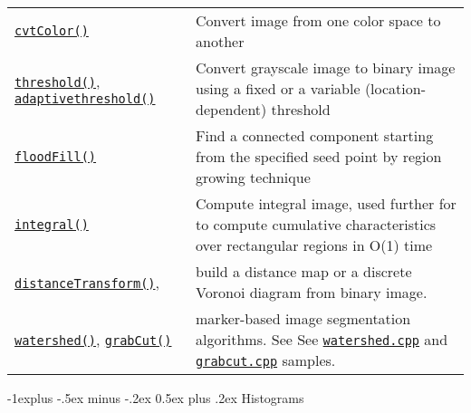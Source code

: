 \documentclass[10pt,landscape]{article}
\makeatletter
\renewcommand{\subsection}{\@startsection{subsection}{2}{0mm}%
                                {-1explus -.5ex minus -.2ex}%
                                {0.5ex plus .2ex}%
                                {\normalfont\normalsize\bfseries}}
\makeatother
\begin{document}
\begin{multicols}{3}
\begin{tabular}{@{}p{\the\MyLen}%
                @{}p{\linewidth-\the\MyLen}@{}}

\texttt{\href{http://opencv.willowgarage.com/documentation/cpp/miscellaneous_image_transformations.html\#cvtColor}{cvtColor()}} & Convert image from one color space to another \\

\texttt{\href{http://opencv.willowgarage.com/documentation/cpp/miscellaneous_image_transformations.html\#threshold}{threshold()}}, \texttt{\href{http://opencv.willowgarage.com/documentation/cpp/miscellaneous_image_transformations.html\#adaptivethreshold}{adaptivethreshold()}} & Convert grayscale image to binary image using a fixed or a variable (location-dependent) threshold \\

\texttt{\href{http://opencv.willowgarage.com/documentation/cpp/miscellaneous_image_transformations.html\#floodfill}{floodFill()}} & Find a connected component starting from the specified seed point by region growing technique \\

\texttt{\href{http://opencv.willowgarage.com/documentation/cpp/miscellaneous_image_transformations.html\#floodfill}{integral()}} & Compute integral image, used further for to compute cumulative characteristics over rectangular regions in O(1) time \\

\texttt{\href{http://opencv.willowgarage.com/documentation/cpp/miscellaneous_image_transformations.html\#distancetransform}{distanceTransform()}},
 & build a distance map or a discrete Voronoi diagram from binary image. \\

\texttt{\href{http://opencv.willowgarage.com/documentation/cpp/miscellaneous_image_transformations.html\#floodfill}{watershed()}},
\texttt{\href{http://opencv.willowgarage.com/documentation/cpp/miscellaneous_image_transformations.html\#grabcut}{grabCut()}}
 & marker-based image segmentation algorithms. See
 See \texttt{\href{https://code.ros.org/svn/opencv/trunk/opencv/samples/c/watershed.cpp}{watershed.cpp}} and \texttt{\href{https://code.ros.org/svn/opencv/trunk/opencv/samples/c/grabcut.c}{grabcut.cpp}}
 samples.

\end{tabular}

\subsection{Histograms}


\end{multicols}
\end{document}

